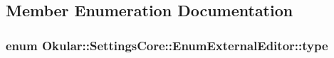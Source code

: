 \subsection{Member Enumeration Documentation}
\hypertarget{classOkular_1_1SettingsCore_1_1EnumExternalEditor_a933c39b8e6ad3e1646a01bfad4197614}{
\subsubsection[{type}]{\setlength{\rightskip}{0pt plus 5cm}enum {\bf Okular\+::\+Settings\+Core\+::\+Enum\+External\+Editor\+::type}}}\label{classOkular_1_1SettingsCore_1_1EnumExternalEditor_a933c39b8e6ad3e1646a01bfad4197614}
